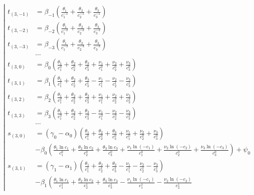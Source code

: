 \begin{equation*} \left| \begin{aligned}
t_{(3,-1)} &=
  \beta_{-1}
  \left(
  \frac{\theta_1}{c_1^{-1}}
+ \frac{\theta_2}{c_2^{-1}}
+ \frac{\theta_3}{c_3^{-1}}
  \right) \\
%
t_{(3,-2)} &=
  \beta_{-2}
  \left(
  \frac{\theta_1}{c_1^{-2}}
+ \frac{\theta_2}{c_2^{-2}}
+ \frac{\theta_3}{c_3^{-2}}
  \right) \\
%
t_{(3,-3)} &=
  \beta_{-3}
  \left(
  \frac{\theta_1}{c_1^{-3}}
+ \frac{\theta_2}{c_2^{-3}}
+ \frac{\theta_3}{c_3^{-3}}
  \right) \\
%
&\ldots \\
%
t_{(3,0)} &=
  \beta_0
  \left(
  \frac{\theta_1}{c_1^0}
+ \frac{\theta_2}{c_2^0}
+ \frac{\theta_3}{c_3^0}
+ \frac{\nu_1}{c_1^0}
+ \frac{\nu_2}{c_2^0}
+ \frac{\nu_3}{c_3^0}
  \right) \\
%
t_{(3,1)} &=
  \beta_1
  \left(
  \frac{\theta_1}{c_1^1}
+ \frac{\theta_2}{c_2^1}
+ \frac{\theta_3}{c_3^1}
- \frac{\nu_1}{c_1^1}
- \frac{\nu_2}{c_2^1}
- \frac{\nu_3}{c_3^1}
  \right) \\
%
t_{(3,2)} &=
  \beta_2
  \left(
  \frac{\theta_1}{c_1^2}
+ \frac{\theta_2}{c_2^2}
+ \frac{\theta_3}{c_3^2}
+ \frac{\nu_1}{c_1^2}
+ \frac{\nu_2}{c_2^2}
+ \frac{\nu_3}{c_3^2}
  \right) \\
%
t_{(3,3)} &=
  \beta_3
  \left(
  \frac{\theta_1}{c_1^3}
+ \frac{\theta_2}{c_2^3}
+ \frac{\theta_3}{c_3^3}
- \frac{\nu_1}{c_1^3}
- \frac{\nu_2}{c_2^3}
- \frac{\nu_3}{c_3^3}
  \right) \\
%
&\ldots \\
%
s_{(3,0)} &=
  (\gamma_0 - \alpha_0)
  \left(
  \frac{\theta_1}{c_1^0}
+ \frac{\theta_2}{c_2^0}
+ \frac{\theta_3}{c_3^0}
+ \frac{\nu_1}{c_1^0}
+ \frac{\nu_2}{c_2^0}
+ \frac{\nu_3}{c_3^0}
  \right) \\ &
- \beta_0
  \left(
  \frac{\theta_1 \ln{c_1}}{c_1^0}
+ \frac{\theta_2 \ln{c_2}}{c_2^0}
+ \frac{\theta_3 \ln{c_3}}{c_3^0}
+ \frac{\nu_1 \ln{(- c_1)}}{c_1^0}
+ \frac{\nu_2 \ln{(- c_2)}}{c_2^0}
+ \frac{\nu_3 \ln{(- c_3)}}{c_3^0}
  \right)
+ \psi_0 \\
%
s_{(3,1)} &=
  (\gamma_1 - \alpha_1)
  \left(
  \frac{\theta_1}{c_1^1}
+ \frac{\theta_2}{c_2^1}
+ \frac{\theta_3}{c_3^1}
- \frac{\nu_1}{c_1^1}
- \frac{\nu_2}{c_2^1}
- \frac{\nu_3}{c_3^1}
  \right) \\ &
- \beta_1
  \left(
  \frac{\theta_1 \ln{c_1}}{c_1^1}
+ \frac{\theta_2 \ln{c_2}}{c_2^1}
+ \frac{\theta_3 \ln{c_3}}{c_3^1}
- \frac{\nu_1 \ln{(- c_1)}}{c_1^1}
- \frac{\nu_2 \ln{(- c_2)}}{c_2^1}

\end{aligned}
\end{equation*}
